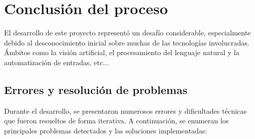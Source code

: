 \section{Conclusión del proceso}

El desarrollo de este proyecto representó un desafío considerable, especialmente debido al desconocimiento inicial sobre muchas de las tecnologías involucradas. Ámbitos como la visión artificial, el procesamiento del lenguaje natural y la automatización de entradas, etc...

\subsection{Errores y resolución de problemas}

Durante el desarrollo, se presentaron numerosos errores y dificultades técnicas que fueron resueltos de forma iterativa. A continuación, se enumeran los principales problemas detectados y las soluciones implementadas:

